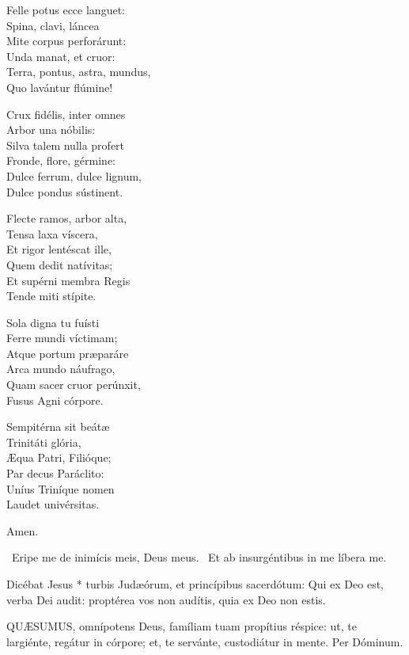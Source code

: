Felle potus ecce languet:\\
Spina, clavi, láncea\\
Mite corpus perforárunt:\\
Unda manat, et cruor:\\
Terra, pontus, astra, mundus,\\
Quo lavántur flúmine!

Crux fidélis, inter omnes\\
Arbor una nóbilis:\\
Silva talem nulla profert\\
Fronde, flore, gérmine:\\
Dulce ferrum, dulce lignum,\\
Dulce pondus sústinent.

Flecte ramos, arbor alta,\\
Tensa laxa víscera,\\
Et rigor lentéscat ille,\\
Quem dedit natívitas;\\
Et supérni membra Regis\\
Tende miti stípite.

Sola digna tu fuísti\\
Ferre mundi víctimam;\\
Atque portum præparáre\\
Arca mundo náufrago,\\
Quam sacer cruor perúnxit,\\
Fusus Agni córpore.

Sempitérna sit beátæ\\
Trinitáti glória,\\
Æqua Patri, Filióque;\\
Par decus Paráclito:\\
Uníus Triníque nomen\\
Laudet univérsitas.

Amen.

\V\ Eripe me de inimícis meis, Deus meus. \R\ Et ab insurgéntibus in me líbera me.

 Dicébat Jesus * turbis Judæórum, et princípibus sacerdótum: Qui ex Deo est, verba Dei audit: proptérea vos non audítis, quia ex Deo non estis.


\lettrine[lines=2]{Q}{UÆSUMUS}, omnípotens Deus, famíliam tuam propítius réspice: ut, te largiénte, regátur in córpore; et, te servánte, custodiátur in mente. Per Dóminum.

